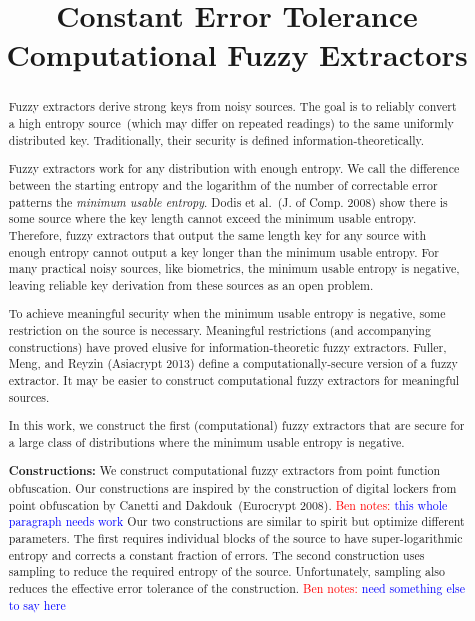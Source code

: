 \documentclass[11pt]{article}
\title{Constant Error Tolerance Computational Fuzzy Extractors}
\newcommand{\authnote}[2]{{\textcolor{red}{\textsf{#1 notes: }\textcolor{blue}{ #2}}\marginpar{\textcolor{red}{\textbf{!!!!!}}}}}
\newcommand{\authnote}[2]{}
\newcommand{\bnote}[1]{{\authnote{Ben}{#1}}}
\begin{document}
\maketitle


\begin{abstract}
Fuzzy extractors derive strong keys from noisy sources.  The goal is to reliably convert a high entropy source~(which may differ on repeated readings) to the same uniformly distributed key.  Traditionally, their security is defined information-theoretically.  %

Fuzzy extractors work for any distribution with enough entropy.  %
We call the difference between the starting entropy and the logarithm of the number of correctable error patterns the \emph{minimum usable entropy}.  Dodis et al.~(J. of Comp. 2008) show there is some source where the key length cannot exceed the minimum usable entropy.  Therefore, fuzzy extractors that output the same length key for any source with enough entropy cannot output a key longer than the minimum usable entropy.
For many practical noisy sources, like biometrics, the minimum usable entropy is negative, leaving reliable key derivation from these sources as an open problem.

To achieve meaningful security when the minimum usable entropy is negative, some restriction on the source is necessary.  Meaningful restrictions (and accompanying constructions) have proved elusive for information-theoretic fuzzy extractors.
Fuller, Meng, and Reyzin (Asiacrypt 2013) define a computationally-secure version of a fuzzy extractor.  It may be easier to construct computational fuzzy extractors for meaningful sources.

In this work, we construct the first (computational) fuzzy extractors that are secure for a large class of distributions where the minimum usable entropy is negative.

\textbf{Constructions:}  We construct computational fuzzy extractors from point function obfuscation.
Our constructions are inspired by the construction of digital lockers from point obfuscation by Canetti and Dakdouk~(Eurocrypt 2008).  
\bnote{this whole paragraph needs work} Our two constructions are similar to spirit but optimize different parameters.  The first requires individual blocks of the source to have super-logarithmic entropy and corrects a constant fraction of errors.  The second construction uses sampling to reduce the required entropy of the source.  Unfortunately, sampling also reduces the effective error tolerance of the construction.  %
\bnote{need something else to say here}
\end{abstract}
\end{document}
